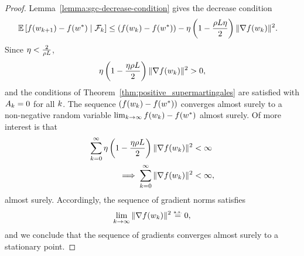 \sgcAlmostSure*
\begin{proof}
    Lemma~\ref{lemma:sgc-decrease-condition} gives the decrease condition
    \begin{align*}
        \mathbb{E} \left[f(w_{k+1}) - f(w^*) \mid \mathcal{F}_k\right] &\leq \left(f(w_k) - f(w^*)\right) - \eta \left(1 - \frac{\rho L \eta}{2}\right)\|\nabla f(w_k)\|^2.
    \end{align*}
    Since \( \eta < \frac{2}{\rho L} \),
    \begin{align*}
        \eta \left(1 - \frac{\eta \rho L}{2}\right)\|\nabla f(w_k)\|^2 > 0,
    \end{align*}
    and the conditions of Theorem~\ref{thm:positive_supermartingales} are satisfied with \( A_k = 0 \) for all \( k \).
    The sequence \( \left(f(w_k) - f(w^*)\right) \) converges almost surely to a non-negative random variable \(\lim_{k \rightarrow \infty} f(w_k) - f(w^*) \) almost surely.
    Of more interest is that
    \begin{align}
        \sum_{k=0}^{\infty} \eta \left(1 - \frac{\eta \rho L}{2}\right) \|\nabla f(w_k)\|^2 &< \infty \nonumber\\
        \implies \sum_{k=0}^{\infty} \|\nabla f(w_k)\|^2 &< \infty, \label{eq:stationary-convergence}
    \end{align}
    almost surely.
    Accordingly, the sequence of gradient norms satisfies
    \[ \lim_{k \rightarrow \infty} \|\nabla f(w_k)\|^2 \stackrel{\text{\rm\tiny a.s.}}{=} 0, \]
    and we conclude that the sequence of gradients converges almost surely to a stationary point.
   

\end{proof}
